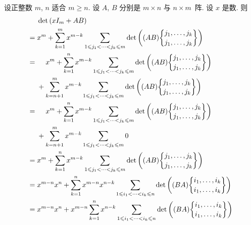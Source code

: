 \documentclass[../libro.tex]{subfiles}
\begin{document}
\begin{example}
    设正整数 \(m\), \(n\) 适合 \(m \geq n\).
    设 \(A\), \(B\) 分别是 \(m \times n\) 与 \(n \times m\)~阵.
    设 \(x\) 是数.
    则
    \begin{align*}
        &
        \det {(xI_m + AB)}
        \\
        = {} &
        x^m
        + \sum_{k = 1}^{m}
        {x^{m-k}
            \sum_{1 \leq j_1 < \dots < j_k \leq m}
            \det {\left(
                    (AB)\submat{j_1,\dots,j_k}{j_1,\dots,j_k}
            \right)}
        }
        \\
        = {} &
        \hphantom{{} + {}}
        x^m
        + \sum_{k = 1}^{n}
        {x^{m-k}
            \sum_{1 \leq j_1 < \dots < j_k \leq m}
            \det {\left(
                    (AB)\submat{j_1,\dots,j_k}{j_1,\dots,j_k}
            \right)}
        }
        \\
        &
        + \sum_{k = n+1}^{m}
        {x^{m-k}
            \sum_{1 \leq j_1 < \dots < j_k \leq m}
            \det {\left(
                    (AB)\submat{j_1,\dots,j_k}{j_1,\dots,j_k}
            \right)}
        }
        \\
        = {} &
        \hphantom{{} + {}}
        x^m
        + \sum_{k = 1}^{n}
        {x^{m-k}
            \sum_{1 \leq j_1 < \dots < j_k \leq m}
            \det {\left(
                    (AB)\submat{j_1,\dots,j_k}{j_1,\dots,j_k}
            \right)}
        }
        \\
        &
        + \sum_{k = n+1}^{m}
        {x^{m-k}
            \sum_{1 \leq j_1 < \dots < j_k \leq m}
            0
        }
        \\
        = {} &
        x^m
        + \sum_{k = 1}^{n}
        {x^{m-k}
            \sum_{1 \leq j_1 < \dots < j_k \leq m}
            \det {\left(
                    (AB)\submat{j_1,\dots,j_k}{j_1,\dots,j_k}
            \right)}
        }
        \\
        = {} &
        x^{m-n} x^n
        + \sum_{k = 1}^{n}
        {x^{m-n} x^{n-k}
            \sum_{1 \leq i_1 < \dots < i_k \leq n}
            \det {\left(
                    (BA)\submat{i_1,\dots,i_k}{i_1,\dots,i_k}
            \right)}
        }
        \\
        = {} &
        x^{m-n} x^n
        + x^{m-n} \sum_{k = 1}^{n}
        {x^{n-k}
            \sum_{1 \leq i_1 < \dots < i_k \leq n}
            \det {\left(
                    (BA)\submat{i_1,\dots,i_k}{i_1,\dots,i_k}
            \right)}
        }
        \\

\end{align*}
\end{example}
\end{document}

